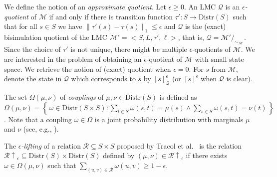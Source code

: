\documentclass[a4paper,UKenglish,cleveref,autoref,thm-restate]{lipics-v2021}
\newcommand{\suchthat}{:}%
\newcommand{\Dist}{\mathrm{Distr}}
\newcommand{\lifting}[1]{\mathord{#1\!\!\uparrow}}
\newcommand{\M}{\mathcal{M}}
\newcommand{\pb}{\mathit{pb}}
\newcommand{\R}{\mathcal{R}}
\newcommand{\Q}{\mathcal{Q}}
\begin{document}
We define the notion of an \emph{approximate quotient}.  Let $\epsilon \ge 0$. An LMC $\Q$ is an \emph{$\epsilon$-quotient} of $\M$ if and only if there is transition function $\tau': S \to \Dist(S)$ such that for all $s \in S$ we have $\|\tau'(s) - \tau(s)\|_1 \le \epsilon$ and $\Q$ is the (exact) bisimulation quotient of the LMC $\M' = <S, L, \tau',\ell>$, that is, $\Q = \M'/_{\sim_{\M'}} $. Since the choice of $\tau'$ is not unique, there might be multiple $\epsilon$-quotients of $\M$. We are interested in the problem of obtaining an $\epsilon$-quotient of $\M$ with small state space. We retrieve the notion of (exact) quotient when $\epsilon = 0$. For $s$ from $\M$, denote the state in $\Q$ which corresponds to $s$ by $[s]^{\epsilon}_{\Q}$ (or $[s]^{\epsilon}$ when $\Q$ is clear).

The set $\Omega(\mu, \nu)$ of \emph{couplings} of $\mu,\nu \in \Dist(S)$ is defined as $\Omega(\mu, \nu)=\left \{ \, \omega \in \Dist(S \times S) \suchthat \sum_{t \in S} \omega(s, t) = \mu(s) \wedge \sum_{s \in S} \omega(s, t) = \nu(t) \, \right \}$. Note that a coupling $\omega \in \Omega$ is a joint probability distribution with marginals $\mu$ and $\nu$ (see, e.g., \cite[page 260-262]{billingsley1995}).




	The \emph{$\epsilon$-lifting} of a relation $\R\subseteq S \times S$ proposed by Tracol et al.~\cite{TracolDesharnaisZhioua2011} is the relation $\lifting{\R}_{\epsilon} \subseteq \Dist(S) \times \Dist(S)$ defined by $(\mu, \nu) \in \lifting{\R}_{\epsilon}$ if there exists $\omega \in \Omega(\mu, \nu)$ such that $\sum_{ (u,v) \in \R} \omega(u, v) \ge 1 - \epsilon$.
\end{document}
